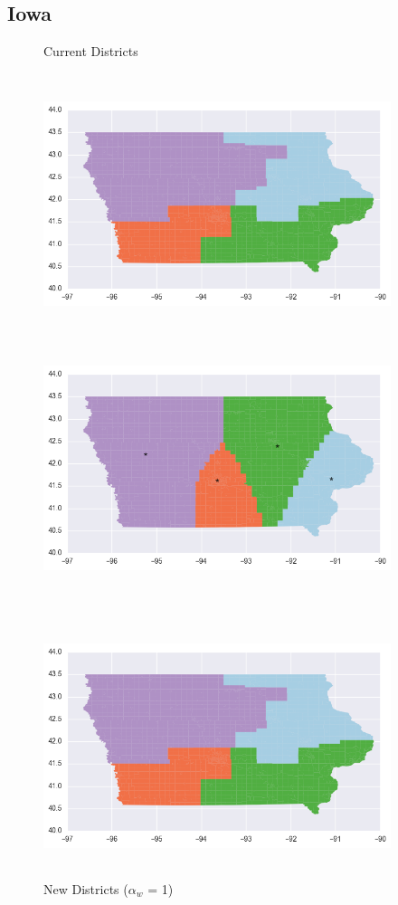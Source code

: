 \subsection{Iowa}
\begin{figure}[htb!] \centering
\caption{ Current Districts }
\includegraphics[width=4in,height=3in,keepaspectratio]{../maps/IA/static/before.png}
\includegraphics[width=4in,height=3in,keepaspectratio]{../maps/IA/static/0_0_after.png}
\caption{ New Districts ($\alpha_w$ = 1) }
\includegraphics[width=4in,height=3in,keepaspectratio]{../maps/IA/static/before.png}

\end{figure}
